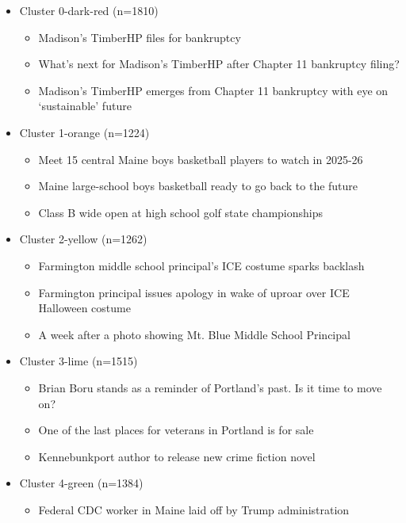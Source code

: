 \documentclass[11pt]{article}
\begin{document}
\begin{itemize}
    \item Cluster \textcolor{kmeans_3}{0-dark-red (n=1810)}
    \begin{itemize}
        \item Madison’s TimberHP files for bankruptcy
        \item What’s next for Madison’s TimberHP after Chapter 11 bankruptcy filing?
        \item Madison’s TimberHP emerges from Chapter 11 bankruptcy with eye on ‘sustainable’ future
    \end{itemize}
    \item Cluster \textcolor{kmeans_1}{1-orange (n=1224)}
    \begin{itemize}
        \item  Meet 15 central Maine boys basketball players to watch in 2025-26
        \item Maine large-school boys basketball ready to go back to the future
        \item Class B wide open at high school golf state championships
    \end{itemize}
    \item Cluster \textcolor{kmeans_4}{2-yellow (n=1262)}
    \begin{itemize}
        \item Farmington middle school principal’s ICE costume sparks backlash
        \item Farmington principal issues apology in wake of uproar over ICE Halloween costume
        \item A week after a photo showing Mt. Blue Middle School Principal
    \end{itemize}
    \item Cluster \textcolor{kmeans_2}{3-lime (n=1515)}
    \begin{itemize}
        \item Brian Boru stands as a reminder of Portland’s past. Is it time to move on?
        \item One of the last places for veterans in Portland is for sale
        \item Kennebunkport author to release new crime fiction novel
    \end{itemize}
    \item Cluster \textcolor{kmeans_5}{4-green (n=1384)}
    \begin{itemize}
        \item Federal CDC worker in Maine laid off by Trump administration

\end{itemize}
\end{itemize}
\end{document}
